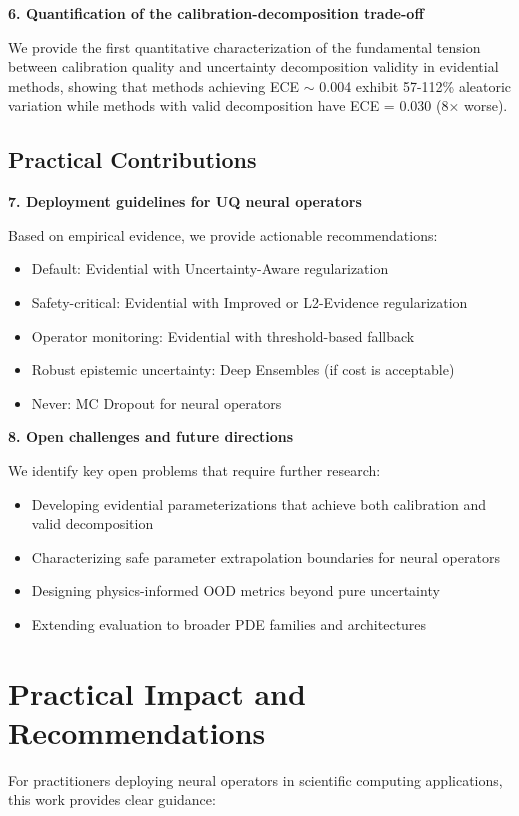 \textbf{6. Quantification of the calibration-decomposition trade-off}

We provide the first quantitative characterization of the fundamental tension between calibration quality and uncertainty decomposition validity in evidential methods, showing that methods achieving ECE $\sim$ 0.004 exhibit 57-112\% aleatoric variation while methods with valid decomposition have ECE = 0.030 (8× worse).

\subsection{Practical Contributions}

\textbf{7. Deployment guidelines for UQ neural operators}

Based on empirical evidence, we provide actionable recommendations:
\begin{itemize}
\item Default: Evidential with Uncertainty-Aware regularization
\item Safety-critical: Evidential with Improved or L2-Evidence regularization
\item Operator monitoring: Evidential with threshold-based fallback
\item Robust epistemic uncertainty: Deep Ensembles (if cost is acceptable)
\item Never: MC Dropout for neural operators
\end{itemize}

\textbf{8. Open challenges and future directions}

We identify key open problems that require further research:
\begin{itemize}
\item Developing evidential parameterizations that achieve both calibration and valid decomposition
\item Characterizing safe parameter extrapolation boundaries for neural operators
\item Designing physics-informed OOD metrics beyond pure uncertainty
\item Extending evaluation to broader PDE families and architectures
\end{itemize}

\section{Practical Impact and Recommendations}

For practitioners deploying neural operators in scientific computing applications, this work provides clear guidance:

